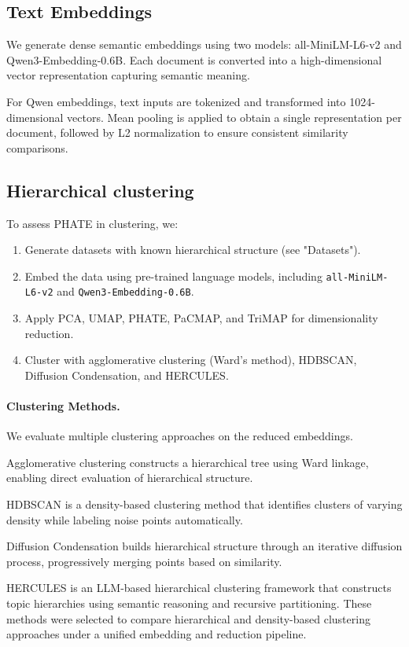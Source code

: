 \subsection{Text Embeddings}

We generate dense semantic embeddings using two models: all-MiniLM-L6-v2 and Qwen3-Embedding-0.6B. Each document is converted into a high-dimensional vector representation capturing semantic meaning.

For Qwen embeddings, text inputs are tokenized and transformed into 1024-dimensional vectors. Mean pooling is applied to obtain a single representation per document, followed by L2 normalization to ensure consistent similarity comparisons.
\subsection{Hierarchical clustering}

To assess PHATE in clustering, we:
\begin{enumerate}
\item Generate datasets with known hierarchical structure (see "Datasets").
\item Embed the data using pre-trained language models, including \texttt{all-MiniLM-L6-v2} and \texttt{Qwen3-Embedding-0.6B}.
\item Apply PCA, UMAP, PHATE, PaCMAP, and TriMAP for dimensionality reduction.
\item Cluster with agglomerative clustering (Ward's method), HDBSCAN, Diffusion Condensation, and HERCULES.
\end{enumerate}

\paragraph{Clustering Methods.}
We evaluate multiple clustering approaches on the reduced embeddings.

Agglomerative clustering constructs a hierarchical tree using Ward linkage, enabling direct evaluation of hierarchical structure.

HDBSCAN is a density-based clustering method that identifies clusters of varying density while labeling noise points automatically.

Diffusion Condensation builds hierarchical structure through an iterative diffusion process, progressively merging points based on similarity.

HERCULES is an LLM-based hierarchical clustering framework that constructs topic hierarchies using semantic reasoning and recursive partitioning.
These methods were selected to compare hierarchical and density-based clustering approaches under a unified embedding and reduction pipeline.
